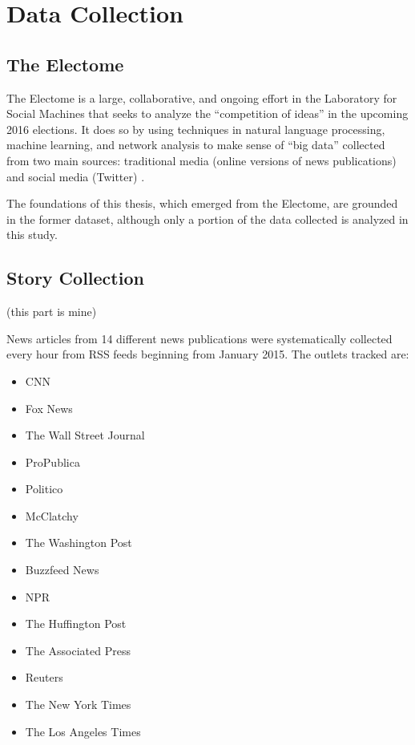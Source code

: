 \chapter{Data Collection}

\section{The Electome}

The Electome is a large, collaborative, and ongoing effort in the Laboratory for Social Machines that seeks to analyze the ``competition of ideas'' in the upcoming 2016 elections. It does so by using techniques in natural language processing, machine learning, and network analysis to make sense of ``big data'' collected from two main sources: traditional media (online versions of news publications) and social media (Twitter) \cite{vvr_electome2016}. 

The foundations of this thesis, which emerged from the Electome, are grounded in the former dataset, although only a portion of the data collected is analyzed in this study.

\section{Story Collection}
(this part is mine)

News articles from 14 different news publications were systematically collected every hour from RSS feeds beginning from January 2015. The outlets tracked are:
 
\begin{itemize}
  \item CNN
  \item Fox News
  \item The Wall Street Journal
  \item ProPublica
  \item Politico
  \item McClatchy
  \item The Washington Post
  \item Buzzfeed News
  \item NPR
  \item The Huffington Post
  \item The Associated Press
  \item Reuters
  \item The New York Times
  \item The Los Angeles Times
\end{itemize}

